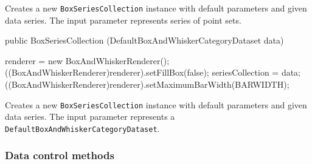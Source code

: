 \begin{tabb}
   Creates a new \texttt{BoxSeriesCollection} instance with default
   parameters and given data series. The input parameter represents series
   of point sets.
\end{tabb}
\begin{htmlonly}
\end{htmlonly}
\begin{code}

   public BoxSeriesCollection (DefaultBoxAndWhiskerCategoryDataset data) \begin{hide} {
      renderer = new BoxAndWhiskerRenderer();
      ((BoxAndWhiskerRenderer)renderer).setFillBox(false);
      seriesCollection = data;
      ((BoxAndWhiskerRenderer)renderer).setMaximumBarWidth(BARWIDTH);
   }\end{hide}
\end{code}
\begin{tabb}
   Creates a new \texttt{BoxSeriesCollection} instance with default parameters and given data series.
   The input parameter represents a \texttt{DefaultBoxAndWhiskerCategoryDataset}.
\end{tabb}
\begin{htmlonly}
\end{htmlonly}


\subsubsection*{Data control methods}

